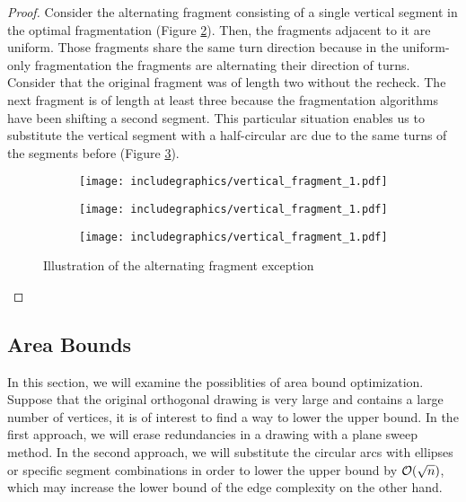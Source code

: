 \begin{proof}
	Consider the alternating fragment consisting of a single vertical segment in the optimal fragmentation (Figure \ref{im:vertical_fragment2}). Then, the fragments adjacent to it are uniform. Those fragments share the same turn direction because in the uniform-only fragmentation the fragments are alternating their direction of turns. Consider that the original fragment was of length two without the recheck. The next fragment is of length at least three because the fragmentation algorithms have been shifting a second segment. This particular situation enables us to substitute the vertical segment with a half-circular arc due to the same turns of the segments before (Figure \ref{im:vertical_fragment3}). 
\begin{figure}[H]
	\centering
	\begin{subfigure}{0.33\linewidth}
		\centering
		\texttt{[image: includegraphics/vertical\_fragment\_1.pdf]}
		\caption{}\label{im:vertical_fragment1}
	\end{subfigure}	
	\begin{subfigure}{0.33\linewidth}
		\centering
		\texttt{[image: includegraphics/vertical\_fragment\_1.pdf]}
		\caption{}\label{im:vertical_fragment2}
	\end{subfigure}
	\begin{subfigure}{0.32\linewidth}
		\centering
		\texttt{[image: includegraphics/vertical\_fragment\_1.pdf]}
		\caption{}\label{im:vertical_fragment3}
	\end{subfigure}
	\caption{Illustration of the alternating fragment exception}\label{im:vertical_fragment}
\end{figure}
\end{proof}
\subsection{Area Bounds}
In this section, we will examine the possiblities of area bound optimization. Suppose that the original orthogonal drawing is very large and contains a large number of vertices, it is of interest to find a way to lower the upper bound. In the first approach, we will erase redundancies in a drawing with a plane sweep method. In the second approach, we will substitute the circular arcs with ellipses or specific segment combinations in order to lower the upper bound by $\mathcal{O}(\sqrt{n})$, which may increase the lower bound of the edge complexity on the other hand.
